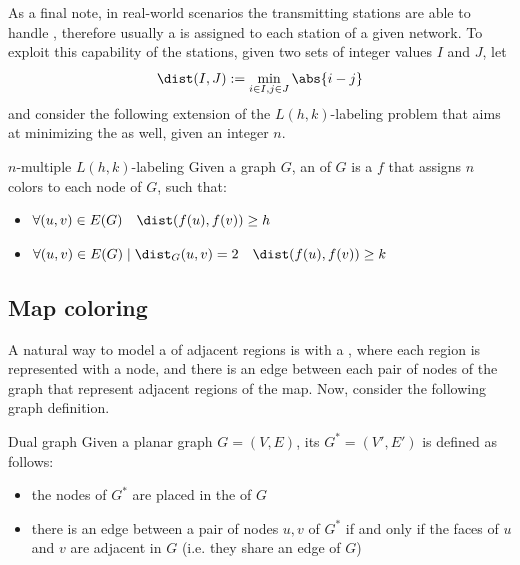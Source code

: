 \documentclass[a4paper, 12pt]{report}
\begin{document}
    As a final note, in real-world scenarios the transmitting stations are able to handle , therefore usually a  is assigned to each station of a given network. To exploit this capability of the stations, given two sets of integer values $I$ and $J$, let $$\dist(I, J) := \min_{i \in I, j \in J}{\abs{i - j}}$$ and consider the following extension of the $L(h, k)$-labeling problem that aims at minimizing the  as well, given an integer $n$.

    \begin{frameddefn}{$n$-multiple $L(h,k)$-labeling}
        Given a graph $G$, an  of $G$ is a  $f$ that assigns $n$ colors to each node of $G$, such that:

        \begin{itemize}
            \item $\forall (u, v) \in E(G) \quad \dist(f(u), f(v)) \ge h$
            \item $\forall (u, v) \in E(G) \mid \dist_G(u, v) = 2 \quad \dist(f(u), f(v)) \ge k$
        \end{itemize}
    \end{frameddefn}

    \subsection{Map coloring}

    A natural way to model a  of adjacent regions is with a , where each region is represented with a node, and there is an edge between each pair of nodes of the graph that represent adjacent regions of the map. Now, consider the following graph definition.

    \begin{frameddefn}{Dual graph}
        Given a planar graph $G = (V, E)$, its  $G^* = (V', E')$ is defined as follows:

        \begin{itemize}
            \item the nodes of $G^*$ are placed in the  of $G$
            \item there is an edge between a pair of nodes $u, v$ of $G^*$ if and only if the faces of $u$ and $v$ are adjacent in $G$ (i.e. they share an edge of $G$)
        \end{itemize}
    \end{frameddefn}
\end{document}
